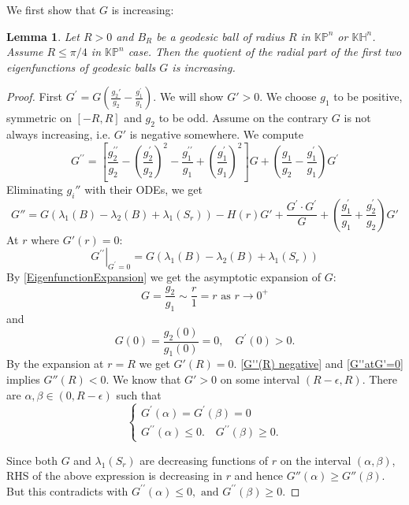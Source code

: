 \documentclass{amsart}
\numberwithin{equation}{section}
\theoremstyle{plain}
\newtheorem{lemma}[theorem]{Lemma}
\theoremstyle{definition}
\theoremstyle{remark}
\def\KK {\mathbb{K}}
\def\HH {\mathbb{H}}
\def\PP {\mathbb{P}}
\begin{document}
We first show that $G$ is increasing:
\begin{lemma}\label{LemmaGisIncreasing}
     Let $R>0$ and $B_R$ be a geodesic ball of radius $R$ in $\KK\PP^n$ or $\KK\HH^n$. Assume $R\leq \pi/4$ in $\KK\PP^n$ case. Then the quotient of the radial part of the first two eigenfunctions of geodesic balls $G$ is increasing.
\end{lemma}
\begin{proof}
    First $ G^{\prime}=G\left(\frac{g_2'}{g_2}-\frac{g_1^{\prime}}{g_1}\right)$. We will show $G'>0$.
    We choose $g_1$ to be positive, symmetric on $[-R, R]$ and $g_2$ to be odd. Assume on the contrary $G$ is not always increasing, i.e. $G'$ is negative somewhere. We compute
    \[G^{\prime \prime}=\left[\frac{g_2^{\prime \prime}}{g_2}-\left(\frac{g_2^{\prime}}{g_2}\right)^2-\frac{g_1^{\prime \prime}}{g_1}+\left(\frac{g_1^{\prime}}{g_1}\right)^2\right] G+\left(\frac{g_1}{g_2}-\frac{g_1^{\prime}}{g_1}\right) G^{\prime}\]
    Eliminating $g_i''$ with their ODEs, we get
    \[G''=G\left(\lambda_1(B)-\lambda_2(B)+\lambda_1\left(S_r\right)\right)-H(r) G'+\frac{G^{\prime} \cdot G^{\prime}}{G}+\left(\frac{g_1^{\prime}}{g_1}+\frac{g_2^{\prime}}{g_2}\right)G'\]
    At $r$ where $G'(r)=0$:
    \begin{equation}\label{G''atG'=0}
        \left.G^{\prime \prime}\right|_{G^{\prime}=0}=G\left(\lambda_1(B)-\lambda_2(B)+\lambda_1\left(S_r\right)\right)
    \end{equation}
    By \cref{EigenfunctionExpansion} we get the asymptotic expansion of $G$:
    \[G=\frac{g_2}{g_1} \sim \frac{r}{1}=r \text { as } r \rightarrow 0^{+}\] and
    \[G(0)=\frac{g_2(0)}{g_1(0)}=0, \quad G^{\prime}(0)>0.\]
   By the expansion at $r=R$ we get $G'(R)= 0$.  \cref{G''(R) negative} and \cref{G''atG'=0} implies $G''(R)<0$. We know that $G'>0$ on some interval $(R-\epsilon,R)$. There are $\alpha, \beta \in (0,R-\epsilon)$ such that 
   \[\left\{\begin{array}{l}
G^{\prime}(\alpha)=G^{\prime}(\beta)=0 \\
G^{\prime \prime}(\alpha) \leq 0 . \quad G^{\prime \prime}(\beta) \geqslant 0 .
\end{array}\right.\]
    
    Since both $G$ and $\lambda_1(S_r)$ are decreasing functions of $r$ on the interval $(\alpha,\beta)$, RHS of the above expression is decreasing in $r$ and hence $G''(\alpha)\geq G''(\beta)$. But this contradicts with $G^{\prime \prime}(\alpha) \leq 0, \text{ and } G^{\prime \prime}(\beta) \geqslant 0$.
\end{proof}
\end{document}
